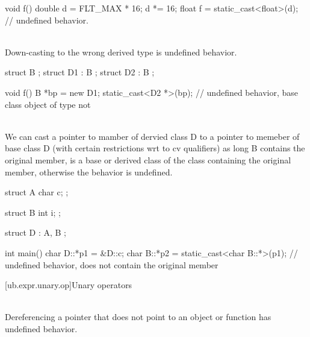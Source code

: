 \pnum
\begin{example}
\begin{codeblock}
void f() {
  double d = FLT_MAX * 16;
  d *= 16;
  float f = static_cast<float>(d);  // undefined behavior.
}
\end{codeblock}
\end{example}


\pnum
\begin{example}
\begin{codeblock}

\end{codeblock}
\end{example}

\pnum
{} \\
Down-casting to the wrong derived type is undefined behavior.

\pnum
\begin{example}
\begin{codeblock}
struct B {};
struct D1 : B {};
struct D2 : B {};

void f() {
  B *bp = new D1;
  static_cast<D2 *>(bp);        // undefined behavior, base class object of type  not 
}
\end{codeblock}
\end{example}

\pnum
{} \\
We can cast a pointer to mamber of dervied class D to a pointer to memeber of base class D (with certain restrictions wrt to cv qualifiers)
as long B contains the original member, is a base or derived class of the class containing the original member, otherwise the behavior is undefined.


\pnum
\begin{example}
\begin{codeblock}
struct A {
  char c;
};

struct B {
  int i;
};

struct D : A, B {};

int main() {
  char D::*p1 = &D::c;
  char B::*p2 = static_cast<char B::*>(p1); // undefined behavior,  does not contain the original member 
}
\end{codeblock}
\end{example}

[ub.expr.unary.op]{Unary operators}

\pnum
{} \\
Dereferencing a pointer that does not point to an object or function
has undefined behavior.

